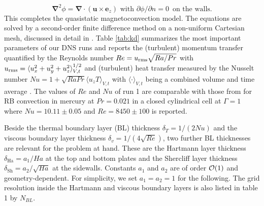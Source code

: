\documentclass{jfm}
\begin{document}
\begin{equation}
\bm \nabla^2 \phi=\bm \nabla \cdot (\bm u\times \bm e_z) \text{  with  } {\partial \phi}/{\partial n}=0\, \text{ on the walls}.
\end{equation}
This completes the quasistatic magnetoconvection model. The equations are solved by a second-order finite difference
method on a non-uniform Cartesian mesh, discussed in detail in \cite{Krasnov2011}. Table \ref{tab:kd} summarizes
the most important parameters of our DNS runs and reports the (turbulent) momentum transfer quantified by the Reynolds number
$Re=u_{\rm rms} \sqrt{Ra/Pr}$ with $u_{\rm rms}=\langle u_x^2+u_y^2+u_z^2\rangle_{V,t}^{1/2}$ and (turbulent) heat transfer measured
by the Nusselt number $Nu=1+\sqrt{RaPr}\langle u_zT\rangle_{V,t}$ with $\langle\cdot\rangle_{V,t}$ being a combined volume
and time average \citep{Scheel2016}. The values of $Re$ and $Nu$ of run 1 are comparable with those from \cite{Scheel2016}
for RB convection in mercury at $Pr=0.021$ in a closed cylindrical cell at $\Gamma=1$ where
$Nu=10.11 \pm 0.05$ and $Re=8450 \pm 100$ is reported.

Beside the thermal boundary layer (BL) thickness $\delta_T=1/(2 Nu)$ and the viscous boundary layer thickness
$\delta_v=1/(4\sqrt{Re})$, two further BL thicknesses are relevant for the problem at hand. These are the Hartmann
layer thickness $\delta_{\text{Ha}} = a_1/Ha$ \citep{Hartmann1937} at the top and bottom plates and the Shercliff
layer thickness $\delta_{\text{Sh}} = a_2/\sqrt{Ha}$ \citep{Shercliff1953} at the sidewalls. Constants $a_1$ and $a_2$ are of order
${\cal O}(1)$ and geometry-dependent. For simplicity, we set $a_1=a_2=1$ for the following. The grid resolution inside
the Hartmann and viscous boundary layers is also listed in table 1 by $N_{BL}$.   
\end{document}
